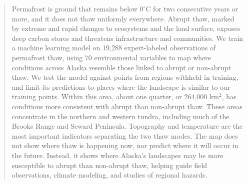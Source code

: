 \documentclass[../main.tex]{subfiles}
\begin{document}
\begin{abstract}
   \begin{plainlanguagesummary}
   Permafrost is ground that remains below $0^\circ$C for two consecutive years or more, and it does not thaw uniformly everywhere. Abrupt thaw, marked by extreme and rapid changes to ecosystems and the land surface, exposes deep carbon stores and threatens infrastructure and communities. We train a machine learning model on 19,288 expert-labeled observations of permafrost thaw, using 70 environmental variables to map where conditions across Alaska resemble those linked to abrupt or non-abrupt thaw. We test the model against points from regions withheld in training, and limit its predictions to places where the landscape is similar to our training points. Within this area, about one quarter, or 264,000 km$^2$, has conditions more consistent with abrupt than non-abrupt thaw. These areas concentrate in the northern and western tundra, including much of the Brooks Range and Seward Peninsula. Topography and temperature are the most important indicators separating the two thaw modes. The map does not show where thaw is happening now, nor predict where it will occur in the future. Instead, it shows where Alaska's landscapes may be more susceptible to abrupt than non-abrupt thaw, helping guide field observations, climate modeling, and studies of regional hazards.
   \end{plainlanguagesummary}

\end{abstract}
\end{document}
